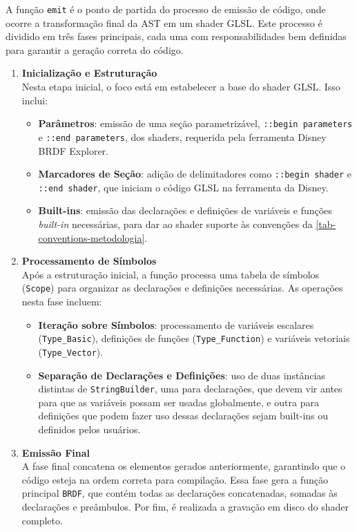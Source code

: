 A função \verb"emit" é o ponto de partida do processo de emissão de código, onde ocorre a transformação final da AST em um shader GLSL. Este processo é dividido em três fases principais, cada uma com responsabilidades bem definidas para garantir a geração correta do código.

\begin{enumerate}
    \item \textbf{Inicialização e Estruturação} \\
    Nesta etapa inicial, o foco está em estabelecer a base do shader GLSL. Isso inclui:
    \begin{itemize}
        \item \textbf{Parâmetros}: emissão de uma seção parametrizável, \verb"::begin parameters" e \verb"::end parameters", dos shaders, requerida pela ferramenta Disney BRDF Explorer.
        \item \textbf{Marcadores de Seção}: adição de delimitadores como \verb|::begin shader| e \verb|::end shader|, que iniciam o código GLSL na ferramenta da Disney.
        \item \textbf{Built-ins}: emissão das declarações e definições de variáveis e funções \textit{built-in} necessárias, para dar ao shader suporte às convenções da \autoref{tab-conventions-metodologia}.
    \end{itemize}

    \item \textbf{Processamento de Símbolos} \\
    Após a estruturação inicial, a função processa uma tabela de símbolos (\verb|Scope|) para organizar as declarações e definições necessárias. As operações nesta fase incluem:
    \begin{itemize}
        \item \textbf{Iteração sobre Símbolos}: processamento de variáveis escalares (\verb|Type_Basic|), definições de funções (\verb|Type_Function|) e variáveis vetoriais (\verb|Type_Vector|).
        \item \textbf{Separação de Declarações e Definições}: uso de duas instâncias distintas de \texttt{StringBuilder}, uma para declarações, que devem vir antes para que as variáveis possam ser usadas globalmente, e outra para definições que podem fazer uso dessas declarações sejam built-ins ou definidos pelos usuários.
    \end{itemize}

    \item \textbf{Emissão Final} \\
    A fase final concatena os elementos gerados anteriormente, garantindo que o código esteja na ordem correta para compilação. Essa fase gera a função principal \verb|BRDF|, que contém todas as declarações concatenadas, somadas às declarações e preâmbulos. Por fim, é realizada a gravação em disco do shader completo.
\end{enumerate}


